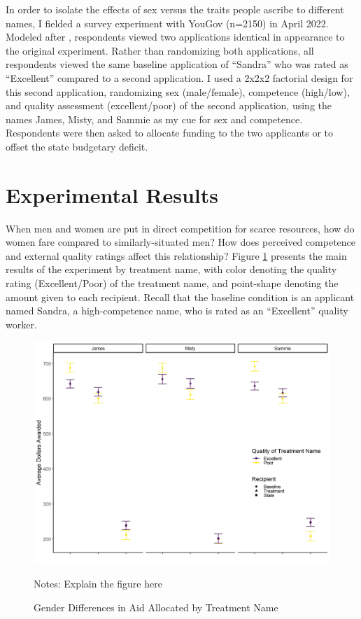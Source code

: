 \documentclass[12pt]{article}%
\begin{document}
\begin{doublespace}
In order to isolate the effects of sex versus the traits people ascribe to different names, I fielded a survey experiment with YouGov (n=2150) in April 2022. Modeled after \cite{desante_working_2013}, respondents viewed two applications identical in appearance to the original experiment. Rather than randomizing both applications, all respondents viewed the same baseline application of ``Sandra” who was rated as ``Excellent” compared to a second application. I used a 2x2x2 factorial design for this second application, randomizing sex (male/female), competence (high/low), and quality assessment (excellent/poor) of the second application, using the names James, Misty, and Sammie as my cue for sex and competence. Respondents were then asked to allocate funding to the two applicants or to offset the state budgetary deficit.

\section*{Experimental Results}
When men and women are put in direct competition for scarce resources, how do women fare compared to similarly-situated men? How does perceived competence and external quality ratings affect this relationship? Figure \ref{results-main} presents the main results of the experiment by treatment name, with color denoting the quality rating (Excellent/Poor) of the treatment name, and point-shape denoting the amount given to each recipient. Recall that the baseline condition is an applicant named Sandra, a high-competence name, who is rated as an ``Excellent” quality worker.

\begin{figure}[h!]
	\centering
	\includegraphics[scale=.8]{figs/general-results-name.png}
	{\singlespacing
		\parbox{0.78\textwidth}{\scriptsize%
			Notes: Explain the figure here
	}}
	\caption{Gender Differences in Aid Allocated by Treatment Name}
	\label{results-main}
\end{figure}


\end{doublespace}
\end{document}
